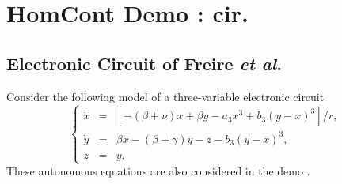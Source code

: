 \documentclass[12pt]{report}
\begin{document}
\chapter{ {\cal HomCont} Demo : cir.} \label{ch:HomCont_cir}

\section{ Electronic Circuit of Freire {\it et al}.}
Consider the following model of a three-variable electronic circuit
\cite{FrRLuGaPo:93}
 \begin{equation}
\left \{ 
\begin{array}{rcl}
\dot{x} & = & \left [-(\beta+\nu) x + \beta y -a_3 x^3 
+b_3(y-x)^3\right ]/r, \\
\dot{y} & = & \beta x -(\beta+\gamma)y -z -b_3(y-x)^3, \\
\dot{z} & = & y.
\end{array}
\right.  
\label{5.fr1}
\end{equation}
These autonomous equations are also considered in the \AUTO demo .
\end{document}
